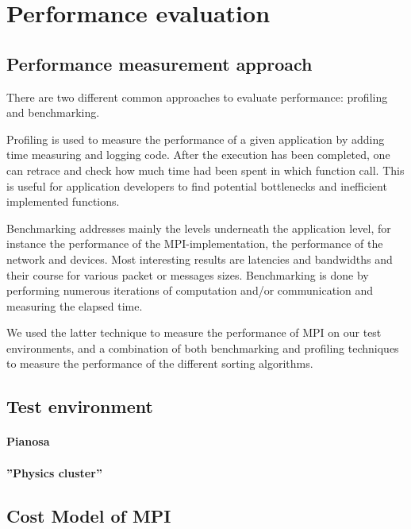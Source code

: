 \section{Performance evaluation}

\subsection{Performance measurement approach}
\label{test-env}
There are two different common approaches to evaluate performance: profiling and benchmarking.

Profiling is used to measure the performance of a given application by adding time measuring and logging code. After the execution has been completed, one can retrace and check how much time had been spent in which function call. This is useful for application developers to find potential bottlenecks and inefficient implemented functions.

Benchmarking addresses mainly the levels underneath the application level, for instance the performance
of the MPI-implementation, the performance of the network and devices. Most interesting results are latencies and bandwidths and their course for various packet or messages sizes. Benchmarking is done by performing numerous iterations of computation and/or communication and measuring the elapsed time.

We used the latter technique to measure the performance of MPI on our test environments, and a combination of both benchmarking and profiling techniques to measure the performance of the different sorting algorithms.

\subsection{Test environment}
\paragraph{Pianosa}
\paragraph{''Physics cluster''}

\subsection{Cost Model of MPI}
\label{MPI-cost-model}
